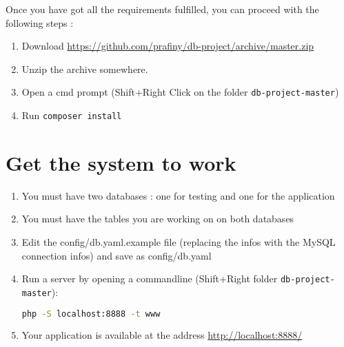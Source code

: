 \documentclass[twoside,a4paper,12pt]{article}
\begin{document}
Once you have got all the requirements fulfilled, you can proceed with the following steps :

\begin{enumerate}
\item Download \url{https://github.com/prafiny/db-project/archive/master.zip}
\item Unzip the archive somewhere.
\item Open a cmd prompt (Shift+Right Click on the folder \texttt{db-project-master})
\item Run \texttt{composer install}
\end{enumerate}

\section{Get the system to work}
\begin{enumerate}
\item You must have two databases : one for testing and one for the application
\item You must have the tables you are working on on both databases
\item Edit the config/db.yaml.example file (replacing the infos with the MySQL connection infos) and save as config/db.yaml
\item Run a server by opening a commandline (Shift+Right  folder \texttt{db-project-master}):
\begin{lstlisting}[language=bash]
php -S localhost:8888 -t www
\end{lstlisting}
\item Your application is available at the address \url{http://localhost:8888/}
\end{enumerate}
\end{document}
